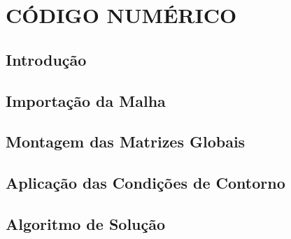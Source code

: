 \chapter{\textbf{CÓDIGO NUMÉRICO}}
\label{codigo numerico}

\section{\textbf{Introdução}} 


\section{\textbf{Importação da Malha}} 
\label{trimesh}



\section{\textbf{Montagem das Matrizes Globais}} 
\label{trielem}



\section{\textbf{Aplicação das Condições de Contorno}} 
\label{tricond}



\section{\textbf{Algoritmo de Solução}} 
\label{simulador}




